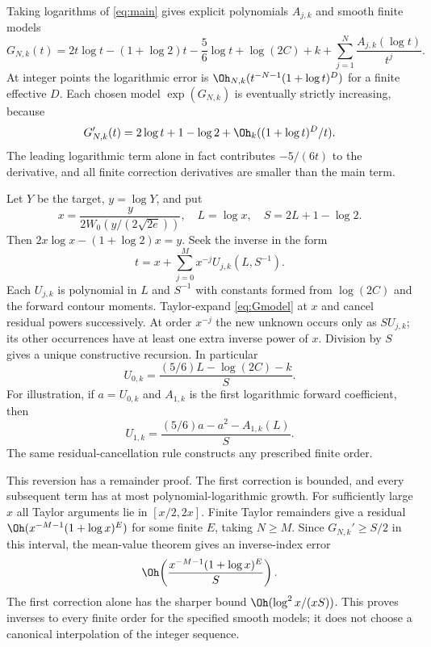 Taking logarithms of \eqref{eq:main} gives explicit polynomials $A_{j,k}$ and smooth finite models
\begin{equation}\label{eq:Gmodel}
 G_{N,k}(t)=2t\log t-(1+\log2)t-\frac56\log t+\log(2C)+k
       +\sum_{j=1}^N\frac{A_{j,k}(\log t)}{t^j}.
\end{equation}
At integer points the logarithmic error is
$\Oh_{N,k}(t^{-N-1}(1+\log t)^D)$ for a finite effective $D$. Each chosen model $\exp(G_{N,k})$ is eventually strictly increasing, because
\[
 G_{N,k}'(t)=2\log t+1-\log2+\Oh_k((1+\log t)^D/t).
\]
The leading logarithmic term alone in fact contributes $-5/(6t)$ to the derivative, and all finite correction derivatives are smaller than the main term.

Let $Y$ be the target, $y=\log Y$, and put
\begin{equation}\label{eq:inversecore}
 x=\frac{y}{2W_0(y/(2\sqrt{2e}))},\quad L=\log x,\quad S=2L+1-\log2.
\end{equation}
Then $2x\log x-(1+\log2)x=y$. Seek the inverse in the form
\begin{equation}\label{eq:inverseansatz}
 t=x+\sum_{j=0}^M x^{-j}U_{j,k}(L,S^{-1}).
\end{equation}
Each $U_{j,k}$ is polynomial in $L$ and $S^{-1}$ with constants formed from $\log(2C)$ and the forward contour moments. Taylor-expand \eqref{eq:Gmodel} at $x$ and cancel residual powers successively. At order $x^{-j}$ the new unknown occurs only as $S U_{j,k}$; its other occurrences have at least one extra inverse power of $x$. Division by $S$ gives a unique constructive recursion. In particular
\begin{equation}\label{eq:inversefirst}
 U_{0,k}=\frac{(5/6)L-\log(2C)-k}{S}.
\end{equation}
For illustration, if $a=U_{0,k}$ and $A_{1,k}$ is the first logarithmic forward coefficient, then
\[
 U_{1,k}=\frac{(5/6)a-a^2-A_{1,k}(L)}{S}.
\]
The same residual-cancellation rule constructs any prescribed finite order.

This reversion has a remainder proof. The first correction is bounded, and every subsequent term has at most polynomial-logarithmic growth. For sufficiently large $x$ all Taylor arguments lie in $[x/2,2x]$. Finite Taylor remainders give a residual
$\Oh(x^{-M-1}(1+\log x)^E)$ for some finite $E$, taking $N\geq M$. Since $G_{N,k}'\geq S/2$ in this interval, the mean-value theorem gives an inverse-index error
\begin{equation}\label{eq:inverseerror}
 \Oh\!\left(\frac{x^{-M-1}(1+\log x)^E}{S}\right).
\end{equation}
The first correction alone has the sharper bound
$\Oh(\log^2 x/(xS))$. This proves inverses to every finite order for the specified smooth models; it does not choose a canonical interpolation of the integer sequence.

